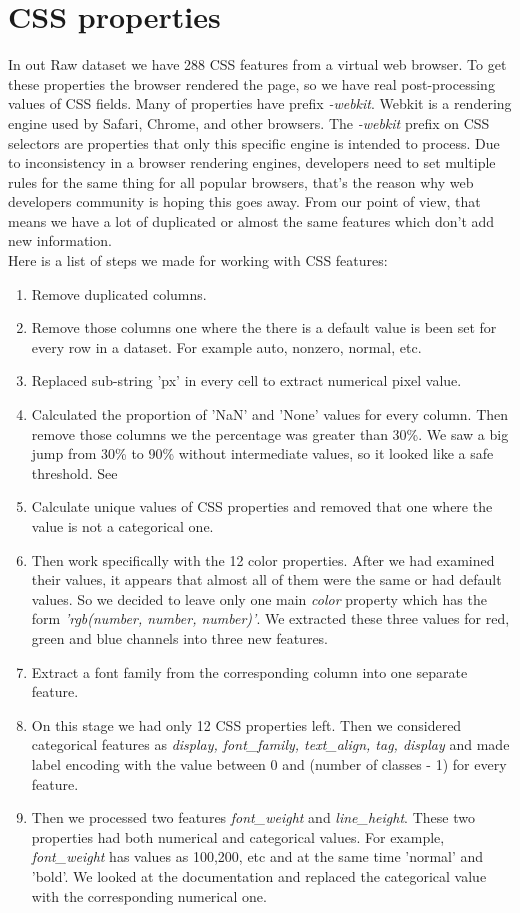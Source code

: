 \section{CSS properties}
In out Raw dataset we have 288 CSS features from a virtual web browser. To get these properties the browser rendered the page, so we have real post-processing values of CSS fields. Many of properties have prefix \textit{-webkit}. Webkit is a rendering engine used by Safari, Chrome, and other browsers. The \textit{-webkit} prefix on CSS selectors are properties that only this specific engine is intended to process. Due to inconsistency in a browser rendering engines, developers need to set multiple rules for the same thing for all popular browsers, that's the reason why web developers community is hoping this goes away. From our point of view, that means we have a lot of duplicated or almost the same features which don't add new information.\\

Here is a list of steps we made for working with CSS features:

\begin{enumerate}
    \item Remove duplicated columns.
    \item Remove those columns one where the there is a default value is been set for every row in a dataset. For example auto, nonzero, normal, etc. 
    \item Replaced sub-string 'px' in every cell to extract numerical pixel value.
    \item Calculated the proportion of 'NaN' and 'None' values for every column. Then remove those columns we the percentage was greater than 30\%. We saw a big jump from 30\% to 90\% without intermediate values, so it looked like a safe threshold. See 
    \item Calculate unique values of CSS properties and removed that one where the value is not a categorical one.   
    \item Then work specifically with the 12 color properties. After we had examined their values, it appears that almost all of them were the same or had default values. So we decided to leave only one main \textit{color} property which has the form \textit{'rgb(number, number, number)'}. We extracted these three values for red, green and blue channels into three new features. 
    \item Extract a font family from the corresponding column into one separate feature.
    \item On this stage we had only 12 CSS properties left. Then we considered categorical features as \textit{display, font\_family, text\_align, tag, display} and made label encoding with the value between 0 and (number of classes - 1) for every feature.
    \item Then we processed two features \textit{font\_weight} and \textit{line\_height}. These two properties had both numerical and categorical values. For example, \textit{font\_weight} has values as 100,200, etc and at the same time 'normal' and 'bold'. We looked at the documentation and replaced the categorical value with the corresponding numerical one. 
\end{enumerate}

